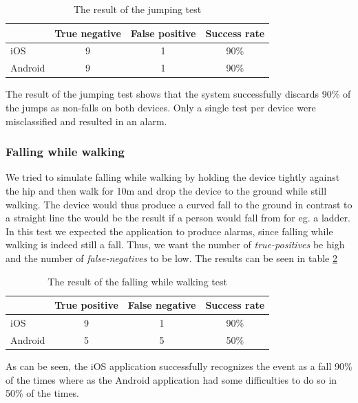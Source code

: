 \documentclass[12pt, a4paper, onecolumn]{article}
\begin{document}
	\begin{table}[H]
		\centering
		\begin{tabular}{|l|c|c|c|}
			\hline
			& True negative & False positive & Success rate \\ \hline
			iOS     & 9            & 1             & 90\%        \\ \hline
			Android & 9            & 1              & 90\%        \\ \hline
		\end{tabular}
		\caption{The result of the jumping test}
		\label{table:jump-test}
	\end{table}
	
	The result of the jumping test shows that the system successfully discards 90\% of the jumps as non-falls on both devices. Only a single test per device were misclassified and resulted in an alarm.
	
	\subsubsection{Falling while walking}
	\label{section:falling-while-walking}
	We tried to simulate falling while walking by holding the device tightly against the hip and then walk for 10m and drop the device to the ground while still walking. The device would thus produce a curved fall to the ground in contrast to a straight line the would be the result if a person would fall from for eg. a ladder. In this test we expected the application to produce alarms, since falling while walking is indeed still a fall. Thus, we want the number of \textit{true-positives} be high and the number of \textit{false-negatives} to be low. The results can be seen in table \ref{table:fall-while-walk}
	
	\begin{table}[H]
		\centering
		\begin{tabular}{|l|c|c|c|}
			\hline
			& True positive & False negative & Success rate \\ \hline
			iOS     & 9            & 1             & 90\%        \\ \hline
			Android & 5            & 5              & 50\%        \\ \hline
		\end{tabular}
		\caption{The result of the falling while walking test}
		\label{table:fall-while-walk}
	\end{table}
	
	As can be seen, the iOS application successfully recognizes the event as a fall 90\% of the times where as the Android application had some difficulties to do so in 50\% of the times.
	
\end{document}
